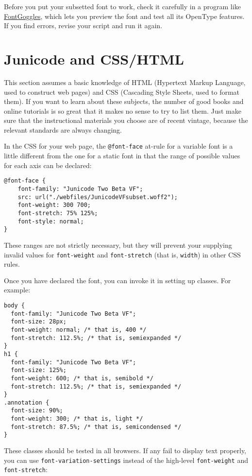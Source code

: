 \documentclass[12pt,letterpaper,openany]{book}
\begin{document}
Before you put your subsetted font to work, check it carefully in a program
like \href{https://github.com/justvanrossum/fontgoggles}{FontGoggles},
which lets you preview the font and test all its OpenType features. If you
find errors, revise your script and run it again.

\section{Junicode and CSS/HTML}

This section assumes a basic knowledge of HTML (Hypertext Markup Language, used
to construct web pages) and CSS (Cascading Style Sheets, used to format them).
If you want to learn about these subjects, the number of good books and online
tutorials is so great that it makes no sense to try to list them. Just make sure
that the instructional materials you choose are of recent vintage, because the
relevant standards are always changing.

In the CSS for your web page, the \texttt{@font-face} at-rule for a variable
font is a little different
from the one for a static font in that the range of possible values for each
axis can be declared:

\begin{verbatim}
@font-face {
    font-family: "Junicode Two Beta VF";
    src: url("./webfiles/JunicodeVFsubset.woff2");
    font-weight: 300 700;
    font-stretch: 75% 125%;
    font-style: normal;
}
\end{verbatim}

\noindent These ranges are not strictly necessary, but they will prevent your
supplying invalid values for \texttt{font-weight} and \texttt{font-stretch}
(that is, \texttt{width}) in other CSS rules.

Once you have declared the font, you can invoke it in setting up classes.
For example:

\begin{verbatim}
body {
  font-family: "Junicode Two Beta VF";
  font-size: 28px;
  font-weight: normal; /* that is, 400 */
  font-stretch: 112.5%; /* that is, semiexpanded */
}
h1 {
  font-family: "Junicode Two Beta VF";
  font-size: 125%;
  font-weight: 600; /* that is, semibold */
  font-stretch: 112.5%; /* that is, semiexpanded */
}
.annotation {
  font-size: 90%;
  font-weight: 300; /* that is, light */
  font-stretch: 87.5%; /* that is, semicondensed */
}
\end{verbatim}

\noindent These classes should be tested in all browsers. If any fail to
display text properly, you can use \texttt{font-variation-settings}
instead of the high-level \texttt{font-weight} and \texttt{font-stretch}:
\end{document}
